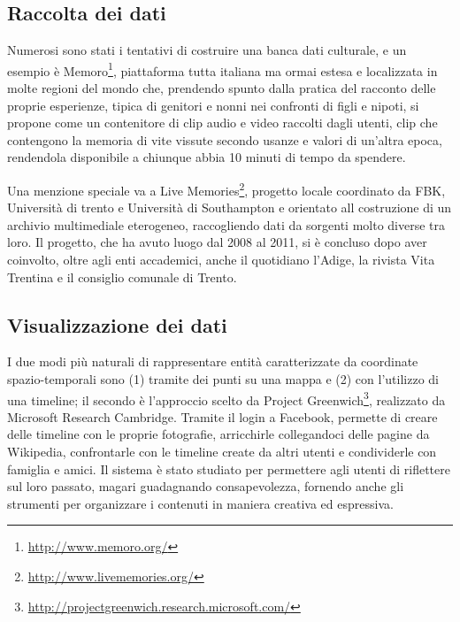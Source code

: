 \documentclass[sigproc-sp.tex]{subfiles}
\begin{document}
\subsection{Raccolta dei dati}
Numerosi sono stati i tentativi di costruire una banca dati culturale, e un esempio è Memoro\footnote{\url{http://www.memoro.org/}}, piattaforma tutta italiana ma ormai estesa e localizzata in molte regioni del mondo che, prendendo spunto dalla pratica del racconto delle proprie esperienze, tipica di genitori e nonni nei confronti di figli e nipoti, si propone come un contenitore di clip audio e video raccolti dagli utenti, clip che contengono la memoria di vite vissute secondo usanze e valori di un'altra epoca, rendendola disponibile a chiunque abbia 10 minuti di tempo da spendere.

Una menzione speciale va a Live Memories\footnote{\url{http://www.livememories.org/}}, progetto locale coordinato da FBK, Università di trento e Università di Southampton e orientato all costruzione di un archivio multimediale eterogeneo, raccogliendo dati da sorgenti molto diverse tra loro. Il progetto, che ha avuto luogo dal 2008 al 2011, si è concluso dopo aver coinvolto, oltre agli enti accademici, anche il quotidiano l’Adige, la rivista Vita Trentina e il consiglio comunale di Trento.

\subsection{Visualizzazione dei dati}
I due modi più naturali di rappresentare entità caratterizzate da coordinate spazio-temporali sono (1) tramite dei punti su una mappa e (2) con l’utilizzo di una timeline; il secondo è l’approccio scelto da Project Greenwich\footnote{\url{http://projectgreenwich.research.microsoft.com/}}, realizzato da Microsoft Research Cambridge. Tramite il login a Facebook, permette di creare delle timeline con le proprie fotografie, arricchirle collegandoci delle pagine da Wikipedia, confrontarle con le timeline create da altri utenti e condividerle con famiglia e amici. Il sistema è stato studiato per permettere agli utenti di riflettere sul loro passato, magari guadagnando consapevolezza, fornendo anche gli strumenti per organizzare i contenuti in maniera creativa ed espressiva.
\end{document}
